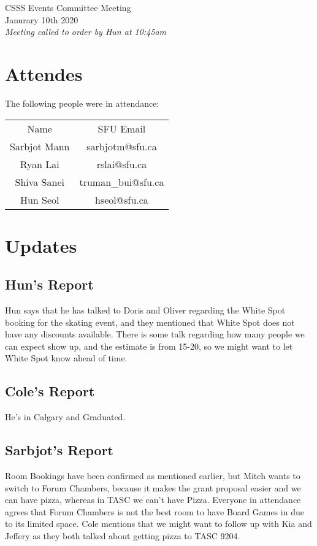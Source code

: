 \documentclass[12pt]{article}
\begin{document}
\begin{center}
CSSS Events Committee Meeting \\
Janurary 10th 2020 \\
\em Meeting called to order by Hun at 10:45am
\end{center}
\tableofcontents
\thispagestyle{empty}
\clearpage
{} 

\newpage 
\section{Attendes} \label{sec:Introduction}
The following people were in attendance: 
\begin{table}[h]
\centering
\begin{tabular}{cc}
Name                   & SFU Email             \\
Sarbjot Mann           & sarbjotm@sfu.ca       \\
Ryan Lai            & rslai@sfu.ca        \\
Shiva Sanei           & truman\_bui@sfu.ca          \\
Hun Seol & hseol@sfu.ca  
\end{tabular}
\end{table}

\section{Updates} \label{sec:Updates}

\subsection{Hun's Report}
\noindent Hun says that he has talked to Doris and Oliver regarding the White Spot booking for the skating event, and they mentioned that White Spot does not have any discounts available.  There is some talk regarding how many people we can expect show up, and the estimate is from 15-20, so we might want to let White Spot know ahead of time.

\subsection{Cole's Report}
\noindent He's in Calgary and Graduated.

\subsection{Sarbjot's Report}
Room Bookings have been confirmed as mentioned earlier, but Mitch wants to switch to Forum Chambers, because it makes the grant proposal easier and we can have pizza, whereas in TASC we can't have Pizza. Everyone in attendance agrees that Forum Chambers is not the best room to have Board Games in due to its limited space. Cole mentions that we might want to follow up with Kia and Jeffery as they both talked about getting pizza to TASC 9204.
\end{document}

